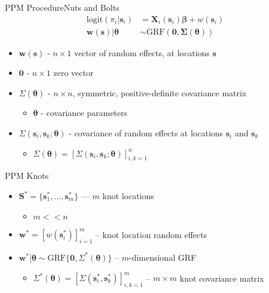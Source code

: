 \documentclass{beamer}
\begin{document}
\begin{frame}{PPM Procedure}{Nuts and Bolts} %
\begin{align*}
\text{logit}(\pi_{i}|\pmb{s}_{i}) &= \pmb{X}_{i}(\pmb{s}_{i}) \pmb{\beta} + w(\pmb{s}_{i}) \\
\pmb{w}(\pmb{s}) | \pmb{\theta} &\sim \text{GRF}(\pmb{0}, \pmb{\Sigma}(\pmb{\theta}))
\end{align*}
\begin{itemize}
\addtolength{\itemsep}{0.5\baselineskip}
\item $\pmb{w}(\pmb{s})$ - $n \times 1$ vector of random effects, at locations $\pmb{s}$
\item $\pmb{0}$ - $n \times 1$ zero vector
\item $\Sigma(\pmb{\theta})$ - $n \times n$, symmetric, positive-definite covariance matrix
    \begin{itemize}
    \item $\pmb{\theta}$ - covariance parameters
    \end{itemize}
\item $\Sigma(\pmb{s}_{i}, \pmb{s}_{k}; \pmb{\theta})$ - covariance of random effects at locations $\pmb{s}_{i}$ and $\pmb{s}_{k}$
      \begin{itemize}
      \addtolength{\itemsep}{0.5\baselineskip}
      \item $\Sigma(\pmb{\theta}) = [\Sigma(\pmb{s}_{i}, \pmb{s}_{k}; \pmb{\theta})]_{i,k=1}^{n}$
      \end{itemize}
\end{itemize}
\end{frame}

\begin{frame}{PPM Knots} %
\begin{itemize}
\addtolength{\itemsep}{0.5\baselineskip}
\item $\pmb{S}^{*} = \{\pmb{s}_{1}^{*}, \dots, \pmb{s}_{m}^{*}\}$ --- $m$ knot locations
  \begin{itemize}
  \item $m < < n$
  \end{itemize}
\item $\pmb{w}^{*} = \left[w(\pmb{s}_{i}^{*})\right]_{i=1}^{m}$ -- knot location random effects


\item $\pmb{w}^{*}|\pmb{\theta} \sim \text{GRF}\{\pmb{0}, \Sigma^{*}(\pmb{\theta})\}$ -- $m$-dimensional GRF \\
    \begin{itemize}
    \item $\Sigma^{*}(\pmb{\theta}) = \left[\Sigma(\pmb{s}_{i}^{*}, \pmb{s}_{k}^{*})\right]_{i,k = 1}^{m}$ -- $m \times m$ knot covariance matrix
    \end{itemize}
\end{itemize}
\end{frame}
\end{document}

